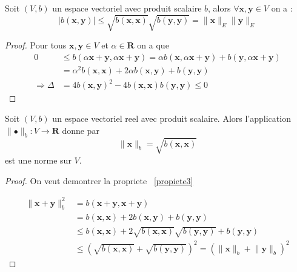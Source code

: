 \begin{lemma}
Soit $(V,b)$ un espace vectoriel avec produit scalaire $b$, alors $\forall \boldsymbol{x},\boldsymbol{y}\in V$ on a :
$$
|b(\boldsymbol{x},\boldsymbol{y})|\le\sqrt{ b(\boldsymbol{x},\boldsymbol{x}) }\sqrt{ b(\boldsymbol{y},\boldsymbol{y}) }=\lVert \boldsymbol{x} \rVert _{E}\lVert \boldsymbol{y} \rVert_{E} 
$$
\end{lemma}
\begin{proof}
Pour tous $\boldsymbol{x},\boldsymbol{y}\in V$ et $\alpha \in \mathbf{R}$ on a que 
\begin{align*}
0&\le b(\alpha \boldsymbol{x}+\boldsymbol{y},\alpha \boldsymbol{x}+\boldsymbol{y})=\alpha b(\boldsymbol{x},\alpha \boldsymbol{x}+\boldsymbol{y})+b(\boldsymbol{y},\alpha \boldsymbol{x}+\boldsymbol{y})\\
&=\alpha^{2}b(\boldsymbol{x},\boldsymbol{x})+2\alpha b(\boldsymbol{x},\boldsymbol{y})+b(\boldsymbol{y},\boldsymbol{y}) \\
\Rightarrow\Delta & =4b(\boldsymbol{x},\boldsymbol{y})^{2}-4b(\boldsymbol{x},\boldsymbol{x})b(\boldsymbol{y},\boldsymbol{y})\le 0
\end{align*}
\end{proof}
\begin{lemma}
Soit $(V,b)$ un espace vectoriel reel avec produit scalaire. Alors l'application $\lVert \bullet \rVert_{b}:V\to \mathbf{R}$ donne par 
$$
\lVert \boldsymbol{x} \rVert _{b}=\sqrt{ b(\boldsymbol{x},\boldsymbol{x}) }
$$
est une norme sur $V$.
\end{lemma}
\begin{proof}
On veut demontrer la propriete ~\ref{propiete3}

\begin{align*}
\lVert \boldsymbol{x}+\boldsymbol{y} \rVert ^{2}_{b} & =b(\boldsymbol{x}+\boldsymbol{y},\boldsymbol{x}+\boldsymbol{y}) \\
 & =b(\boldsymbol{x},\boldsymbol{x})+2b(\boldsymbol{x},\boldsymbol{y})+b(\boldsymbol{\boldsymbol{y},\boldsymbol{y}}) \\
 & \leq b(\boldsymbol{x},\boldsymbol{x})+2\sqrt{ b(\boldsymbol{x},\boldsymbol{x}) }\sqrt{ b(\boldsymbol{y},\boldsymbol{y}) }+b(\boldsymbol{y},\boldsymbol{y}) \\
 &\le \left(\sqrt{ b(\boldsymbol{x},\boldsymbol{x}) }+\sqrt{ b(\boldsymbol{y},\boldsymbol{y}) }\right)^{2}=(\lVert \boldsymbol{x} \rVert _{b}+\lVert \boldsymbol{y} \rVert _{b})^{2}
\end{align*}

\end{proof}

